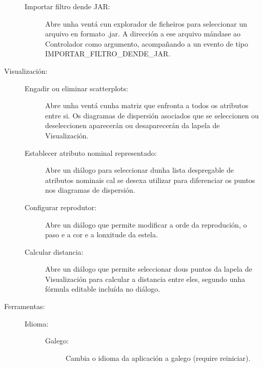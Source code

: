 \begin{description}
\begin{description}
\item[Importar filtro dende JAR:] \hfill
Abre unha ventá cun explorador de ficheiros para seleccionar un arquivo en formato .jar. A dirección a ese arquivo mándase ao Controlador como argumento, acompañando a un evento de tipo IMPORTAR\_FILTRO\_DENDE\_JAR.

\end{description}

\item[Visualización:] \hfill

\begin{description}

\item[Engadir ou eliminar scatterplots:] \hfill
Abre unha ventá cunha matriz que enfronta a todos os atributos entre si. Os diagramas de dispersión asociados que se seleccionen ou deseleccionen aparecerán ou desaparecerán da lapela de Visualización.

\item[Establecer atributo nominal representado:] \hfill
Abre un diálogo para seleccionar dunha lista despregable de atributos nominais cal se desexa utilizar para diferenciar os puntos nos diagramas de dispersión.

\item[Configurar reprodutor:] \hfill
Abre un diálogo que permite modificar a orde da reprodución, o paso e a cor e a lonxitude da estela.

\item[Calcular distancia:] \hfill
Abre un diálogo que permite seleccionar dous puntos da lapela de Visualización para calcular a distancia entre eles, segundo unha fórmula editable incluída no diálogo.

\end{description}

\item[Ferramentas:] \hfill

\begin{description}

\item[Idioma:] \hfill

\begin{description}

\item[Galego:] \hfill
Cambia o idioma da aplicación a galego (require reiniciar).

\end{description}

\begin{description}


\end{description}
\end{description}
\end{description}
